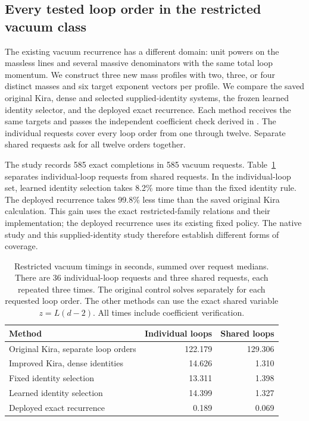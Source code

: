 \subsection{Every tested loop order in the restricted vacuum class}
The existing vacuum recurrence has a different domain: unit powers on the massless lines and several massive denominators with the same total loop momentum. We construct three new mass profiles with two, three, or four distinct masses and six target exponent vectors per profile. We compare the saved original Kira, dense and selected supplied-identity systems, the frozen learned identity selector, and the deployed exact recurrence. Each method receives the same targets and passes the independent coefficient check derived in \CoverageVacuumDerivation{}. The individual requests cover every loop order from one through twelve. Separate shared requests ask for all twelve orders together.

The study records 585 exact completions in 585 vacuum requests. Table~\ref{tab:coverage-vacuum} separates individual-loop requests from shared requests. In the individual-loop set, learned identity selection takes 8.2\% more time than the fixed identity rule. The deployed recurrence takes 99.8\% less time than the saved original Kira calculation. This gain uses the exact restricted-family relations and their implementation; the deployed recurrence uses its existing fixed policy. The native study and this supplied-identity study therefore establish different forms of coverage.

\begin{table}[!htbp]\centering\small
\caption{Restricted vacuum timings in seconds, summed over request medians. There are 36 individual-loop requests and three shared requests, each repeated three times. The original control solves separately for each requested loop order. The other methods can use the exact shared variable $z=L(d-2)$. All times include coefficient verification.}
\label{tab:coverage-vacuum}
\begin{tabular}{@{}lrr@{}}\toprule
Method & Individual loops & Shared loops\\\midrule
Original Kira, separate loop orders & 122.179 & 129.306\\
Improved Kira, dense identities & 14.626 & 1.310\\
Fixed identity selection & 13.311 & 1.398\\
Learned identity selection & 14.399 & 1.327\\
Deployed exact recurrence & 0.189 & 0.069\\
\bottomrule\end{tabular}
\end{table}

